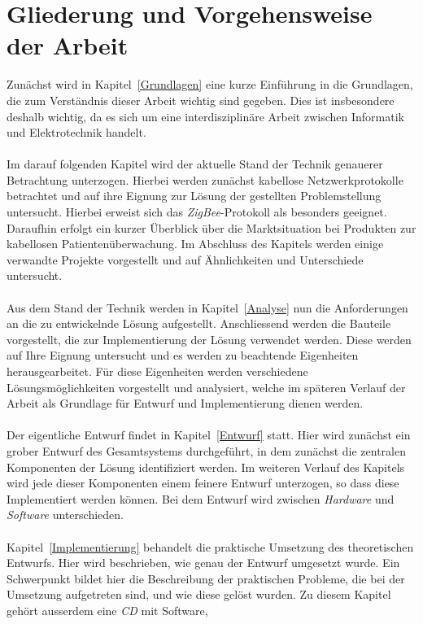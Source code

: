 \section{Gliederung und Vorgehensweise der Arbeit}
Zunächst wird in Kapitel~\ref{Grundlagen} eine kurze Einführung in die Grundlagen,
die zum Verständnis dieser Arbeit wichtig sind gegeben. Dies ist insbesondere deshalb
wichtig, da es sich um eine interdisziplinäre Arbeit zwischen Informatik und Elektrotechnik handelt.\\
\\
Im darauf folgenden Kapitel wird der aktuelle Stand der Technik genauerer Betrachtung
unterzogen. Hierbei werden zunächst kabellose Netzwerkprotokolle betrachtet und auf
ihre Eignung zur Lösung der gestellten Problemstellung untersucht. Hierbei erweist
sich das \emph{ZigBee}-Protokoll als besonders geeignet. Daraufhin erfolgt
ein kurzer Überblick über die Marktsituation bei Produkten zur kabellosen
Patientenüberwachung. Im Abschluss des Kapitels werden einige verwandte Projekte
vorgestellt und auf Ähnlichkeiten und Unterschiede untersucht.\\
\\
Aus dem Stand der Technik werden in Kapitel~\ref{Analyse} nun die Anforderungen an
die zu entwickelnde Lösung aufgestellt. Anschliessend werden die Bauteile vorgestellt,
die zur Implementierung der Lösung verwendet werden. Diese werden auf Ihre Eignung
untersucht und es werden zu beachtende Eigenheiten herausgearbeitet. Für diese
Eigenheiten werden verschiedene Lösungsmöglichkeiten vorgestellt und analysiert,
welche im späteren Verlauf der Arbeit als Grundlage für Entwurf und Implementierung
dienen werden.\\
\\
Der eigentliche Entwurf findet in Kapitel~\ref{Entwurf} statt. Hier wird zunächst
ein grober Entwurf des Gesamtsystems durchgeführt, in dem zunächst die zentralen
Komponenten der Lösung identifiziert werden. Im weiteren Verlauf des Kapitels
wird jede dieser Komponenten einem feinere Entwurf unterzogen, so dass diese
Implementiert werden können. Bei dem Entwurf wird zwischen \emph{Hardware}
und \emph{Software} unterschieden.\\
\\
Kapitel~\ref{Implementierung} behandelt die praktische Umsetzung des theoretischen Entwurfs.
Hier wird beschrieben, wie genau der Entwurf umgesetzt wurde. Ein Schwerpunkt bildet
hier die Beschreibung der praktischen Probleme, die bei der Umsetzung aufgetreten sind, 
und wie diese gelöst wurden. Zu diesem Kapitel gehört ausserdem eine \emph{CD} mit Software,
